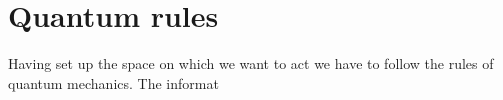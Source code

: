 \section{Quantum rules}
Having set up the space on which we want to act we have to follow the rules of quantum mechanics. The informat